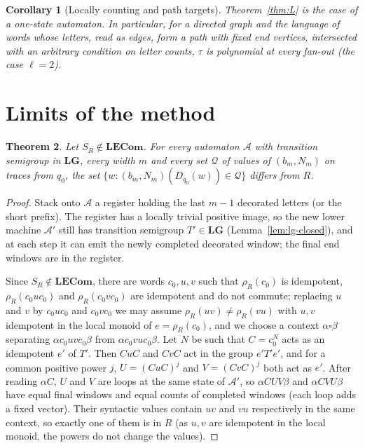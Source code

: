 \documentclass[11pt]{article}
\numberwithin{equation}{section}
\theoremstyle{plain}
\newtheorem{theorem}{Theorem}[section]
\newtheorem{corollary}[theorem]{Corollary}
\theoremstyle{definition}
\theoremstyle{remark}
\theoremstyle{plain}
\newcommand{\blank}{\square}
\newcommand{\LG}{\mathbf{LG}}
\newcommand{\LECom}{\mathbf{L}\mathbf{ECom}}
\begin{document}
\begin{corollary}[Locally counting and path targets]
\label{cor:local}
Theorem~\ref{thm:L} is the case of a one-state automaton.  In particular, for a
directed graph and the language of words whose letters, read as edges, form a
path with fixed end vertices, intersected with an arbitrary condition on letter
counts, $\tau$ is polynomial at every fan-out (the case $\ell=2$).
\end{corollary}

\section{Limits of the method}
\label{sec:limits}

\begin{theorem}
\label{thm:limits}
Let $S_R\notin\LECom$.  For every automaton $\mathcal A$ with transition semigroup
in $\LG$, every width $m$ and every set $\mathcal Q$ of values of $(b_m,N_m)$ on
traces from $q_0$, the set $\{w:(b_m,N_m)(D_{q_0}(w))\in\mathcal Q\}$ differs from
$R$.
\end{theorem}

\begin{proof}
Stack onto $\mathcal A$ a register holding the last $m-1$ decorated letters (or the
short prefix).  The register has a locally trivial positive image, so the new
lower machine $\mathcal A'$ still has transition semigroup $T'\in\LG$
(Lemma~\ref{lem:lg-closed}), and at each step it can emit the newly completed
decorated window; the final end windows are in the register.

Since $S_R\notin\LECom$, there are words $c_0,u,v$ such that $\rho_R(c_0)$ is
idempotent, $\rho_R(c_0uc_0)$ and $\rho_R(c_0vc_0)$ are idempotent and do not
commute; replacing $u$ and $v$ by $c_0uc_0$ and $c_0vc_0$ we may assume
$\rho_R(uv)\ne\rho_R(vu)$ with $u,v$ idempotent in the local monoid of
$e=\rho_R(c_0)$, and we choose a context $\alpha\blank\beta$ separating
$\alpha c_0uvc_0\beta$ from $\alpha c_0vuc_0\beta$.  Let $N$ be such that
$C=c_0^N$ acts as an idempotent $e'$ of $T'$.  Then $CuC$ and $CvC$ act in the
group $e'T'e'$, and for a common positive power $j$, $U=(CuC)^j$ and $V=(CvC)^j$
both act as $e'$.  After reading $\alpha C$, $U$ and $V$ are loops at the same
state of $\mathcal A'$, so $\alpha CUV\beta$ and $\alpha CVU\beta$ have equal final
windows and equal counts of completed windows (each loop adds a fixed vector).
Their syntactic values contain $uv$ and $vu$ respectively in the same context, so
exactly one of them is in $R$ (as $u,v$ are idempotent in the local monoid, the
powers do not change the values).
\end{proof}
\end{document}
